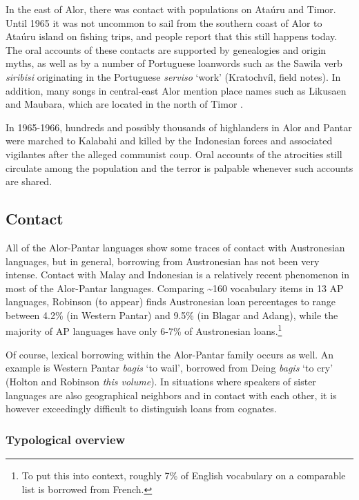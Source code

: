 In the east of Alor, there was contact with populations on Ata\'uru and Timor. Until 1965 it was not uncommon to sail from the southern coast of Alor to Ata\'uru island on fishing trips, and people report that this still happens today. The oral accounts of these contacts are supported by genealogies and origin myths, as well as by a number of Portuguese loanwords such as the Sawila verb \textit{siribisi} originating in the Portuguese \textit{serviso} `work' (Kratochv\'il, field notes). In addition, many songs in central-east Alor mention place names such as Likusaen and Maubara, which are located in the north of Timor \citep{WellfeltEtAl2013}.

In 1965-1966, hundreds and possibly thousands of highlanders in Alor and Pantar were marched to Kalabahi and killed by the Indonesian forces and associated vigilantes after the alleged communist coup. Oral accounts of the atrocities still circulate among the population and the terror is palpable whenever such accounts are shared.

\subsection{Contact}
All of the Alor-Pantar languages show some traces of contact with Austronesian languages, but in general, borrowing from Austronesian has not been very intense. Contact with Malay and Indonesian is a relatively recent phenomenon in most of the Alor-Pantar languages. Comparing \~{}160 vocabulary items in 13 AP languages, Robinson (to appear) finds Austronesian loan percentages to range between 4.2\% (in Western Pantar) and 9.5\% (in Blagar and Adang), while the majority of AP languages have only 6-7\% of Austronesian loans.\footnote{To put this into context,  roughly 7\% of English vocabulary on a comparable list is borrowed from French.
}

Of course, lexical borrowing within the Alor-Pantar family occurs as well. An example is Western Pantar \textit{bagis} `to wail', borrowed from Deing \textit{bagis} `to cry' (Holton and Robinson \textit{this volume}). In situations where speakers of sister languages are also geographical neighbors and in contact with each other, it is however exceedingly difficult to distinguish loans from cognates.

\subsubsection{Typological overview}


